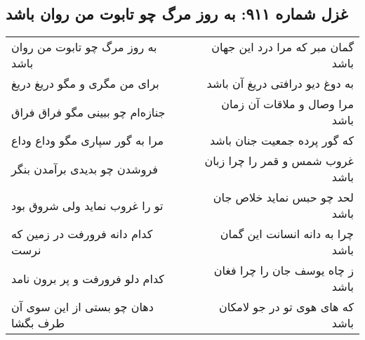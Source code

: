 \begin{center}
\section*{غزل شماره ۹۱۱: به روز مرگ چو تابوت من روان باشد}
\label{sec:0911}
\begin{longtable}{l p{0.5cm} r}
به روز مرگ چو تابوت من روان باشد
&&
گمان مبر که مرا درد این جهان باشد
\\
برای من مگری و مگو دریغ دریغ
&&
به دوغ دیو درافتی دریغ آن باشد
\\
جنازه‌ام چو ببینی مگو فراق فراق
&&
مرا وصال و ملاقات آن زمان باشد
\\
مرا به گور سپاری مگو وداع وداع
&&
که گور پرده جمعیت جنان باشد
\\
فروشدن چو بدیدی برآمدن بنگر
&&
غروب شمس و قمر را چرا زبان باشد
\\
تو را غروب نماید ولی شروق بود
&&
لحد چو حبس نماید خلاص جان باشد
\\
کدام دانه فرورفت در زمین که نرست
&&
چرا به دانه انسانت این گمان باشد
\\
کدام دلو فرورفت و پر برون نامد
&&
ز چاه یوسف جان را چرا فغان باشد
\\
دهان چو بستی از این سوی آن طرف بگشا
&&
که های هوی تو در جو لامکان باشد
\\
\end{longtable}
\end{center}
